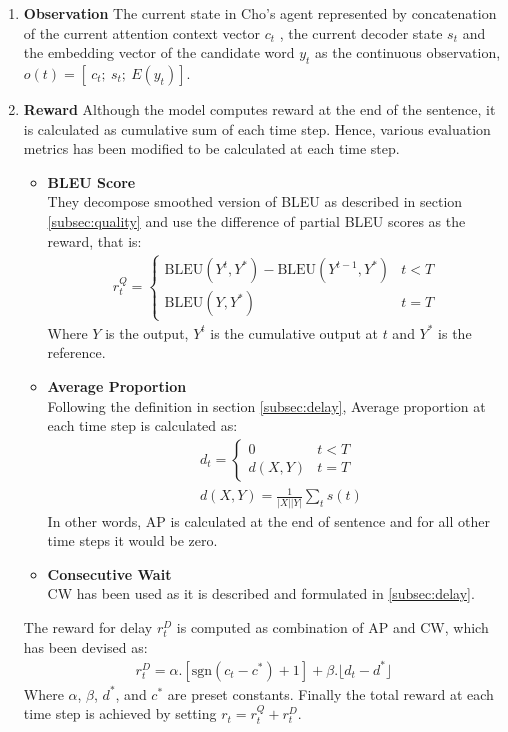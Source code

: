 \documentclass{sfuthesis}
\begin{document}
\begin{enumerate}
    \item \textbf{Observation} The current state in Cho's agent represented by concatenation of the current attention context vector $c_t$ , the current decoder state $s_t$ and the embedding vector of the candidate word $y_t$ as the continuous observation, $o(t) = [\ c_t ;\ s_t ;\ E (y_t )]$.
    \item \textbf{Reward}
    Although the model computes reward at the end of the sentence, it is calculated as cumulative sum of each time step. Hence, various evaluation metrics has been modified to be calculated at each time step.
    \begin{itemize}
        \item \textbf{BLEU Score}\\
        They decompose smoothed version of BLEU as described in section \ref{subsec:quality} and use the difference of partial BLEU scores as the reward, that is:
        \begin{align*}
            r_t^Q = 
            \begin{cases}
            \text{BLEU}(Y^t, Y^*) - \text{BLEU}(Y^{t-1}, Y^*) & t<T \\
            \text{BLEU}(Y, Y^*) & t=T
            \end{cases}
        \end{align*}
        Where $Y$ is the output, $Y^t$ is the cumulative output at $t$ and $Y^*$ is the reference.
        \item \textbf{Average Proportion}\\
        Following the definition in section \ref{subsec:delay}, Average proportion at each time step is calculated as:
        \begin{align*}
            &d_t = 
            \begin{cases}
            0       & t<T \\
            d(X, Y) & t=T
            \end{cases} \\[10pt]
            &d(X, Y) = \frac{1}{|X||Y|} \sum_t s(t)
        \end{align*}
        In other words, AP is calculated at the end of sentence and for all other time steps it would be zero.
        \item \textbf{Consecutive Wait}\\
        CW has been used as it is described and formulated in \ref{subsec:delay}.
    \end{itemize}
    The reward for delay $r_t^D$ is computed as combination of AP and CW, which has been devised as: 
    \begin{align}
        r_t^D = \alpha . [\text{sgn}(c_t - c^*)+1] + \beta . \lfloor d_t - d^* \rfloor
        \label{eq:reward}
    \end{align}
    Where $\alpha$, $\beta$, $d^*$, and $c^*$ are preset constants. Finally the total reward at each time step is achieved by setting $r_t = r_t^Q + r_t^D$.
\end{enumerate}
\end{document}
